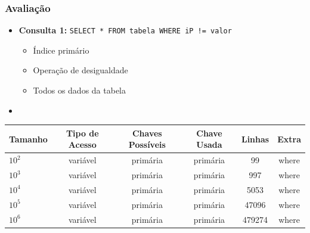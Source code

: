 \documentclass[10pt]{beamer}
\begin{document}
\begin{frame}[fragile]
  \frametitle{Avaliação}

    \begin{itemize}
      \item \textbf{Consulta 1: } \texttt{SELECT * FROM tabela WHERE iP != valor}
      \begin{itemize}
        \item[-] Índice primário
        \item[-] Operação de desigualdade
        \item[-] Todos os dados da tabela
      \end{itemize}

      \item[\ ] \ 

    \end{itemize}

     \begin{table}[!htb]
    \footnotesize
    \centering
    \begin{tabular}{lccccc}
      \toprule
      \textbf{Tamanho} & \textbf{Tipo de Acesso}  & \textbf{Chaves Possíveis}  & \textbf{Chave Usada} & \textbf{Linhas} & \textbf{Extra}  \\
      \midrule
      $10^2$  & variável  &  primária  & primária  & 99      & where  \\
      $10^3$  & variável  &  primária  & primária  & 997     & where  \\
      $10^4$  & variável  &  primária  & primária  & 5053    & where  \\
      $10^5$  & variável  &  primária  & primária  & 47096   & where  \\
      $10^6$  & variável  &  primária  & primária  & 479274  & where  \\

      \bottomrule
    \end{tabular}
    \end{table}
   

\end{frame}
\end{document}
